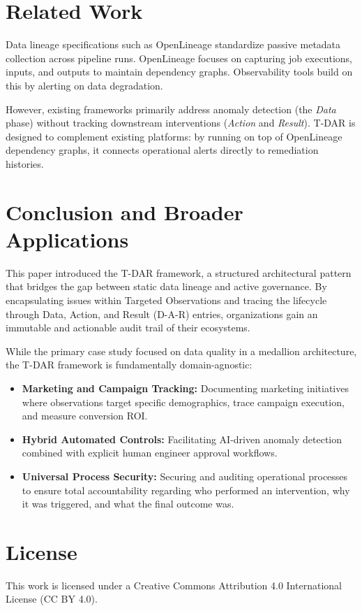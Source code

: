 \documentclass[11pt,a4paper]{article}
\begin{document}
\section{Related Work}
Data lineage specifications such as OpenLineage \cite{openlineage} standardize passive metadata collection across pipeline runs. OpenLineage focuses on capturing job executions, inputs, and outputs to maintain dependency graphs. Observability tools build on this by alerting on data degradation.

However, existing frameworks primarily address anomaly detection (the \textit{Data} phase) without tracking downstream interventions (\textit{Action} and \textit{Result}). T-DAR is designed to complement existing platforms: by running on top of OpenLineage dependency graphs, it connects operational alerts directly to remediation histories.

\section{Conclusion and Broader Applications}
This paper introduced the T-DAR framework, a structured architectural pattern that bridges the gap between static data lineage and active governance. By encapsulating issues within Targeted Observations and tracing the lifecycle through Data, Action, and Result (D-A-R) entries, organizations gain an immutable and actionable audit trail of their ecosystems.

While the primary case study focused on data quality in a medallion architecture, the T-DAR framework is fundamentally domain-agnostic:
\begin{itemize}
    \item \textbf{Marketing and Campaign Tracking:} Documenting marketing initiatives where observations target specific demographics, trace campaign execution, and measure conversion ROI.
    \item \textbf{Hybrid Automated Controls:} Facilitating AI-driven anomaly detection combined with explicit human engineer approval workflows.
    \item \textbf{Universal Process Security:} Securing and auditing operational processes to ensure total accountability regarding who performed an intervention, why it was triggered, and what the final outcome was.
\end{itemize}

\section*{License}
This work is licensed under a Creative Commons Attribution 4.0 International License (CC BY 4.0).
\end{document}
